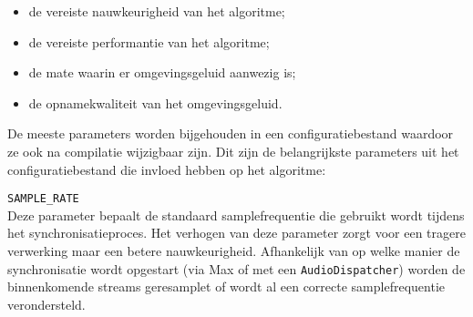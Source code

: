 \begin{itemize}[noitemsep]
\item de vereiste nauwkeurigheid van het algoritme;
\item de vereiste performantie van het algoritme;
\item de mate waarin er omgevingsgeluid aanwezig is;
\item de opnamekwaliteit van het omgevingsgeluid.
\end{itemize}

De meeste parameters worden bijgehouden in een configuratiebestand waardoor ze ook na compilatie wijzigbaar zijn. Dit zijn de belangrijkste parameters uit het configuratiebestand die invloed hebben op het algoritme:

\begin{description}
\item\texttt{SAMPLE\_RATE} \hfill \\
Deze parameter bepaalt de standaard samplefrequentie die gebruikt wordt tijdens het synchronisatieproces. Het verhogen van deze parameter zorgt voor een tragere verwerking maar een betere nauwkeurigheid. Afhankelijk van op welke manier de synchronisatie wordt opgestart (via Max of met een \texttt{AudioDispatcher}) worden de binnenkomende streams geresamplet of wordt al een correcte samplefrequentie verondersteld.


\end{description}

